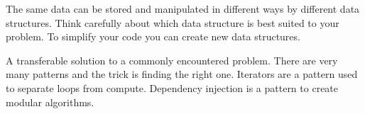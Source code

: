 \documentclass[8pt]{extarticle}
\begin{document}
\begin{bluebox}[title=Data Structures]
  The same data can be stored and manipulated in different ways by different
  data structures. Think carefully about which data structure is best suited to
  your problem. To simplify your code you can create new data structures.
\end{bluebox}

\begin{navybox}[title=Structuring Code]
\end{navybox}

\begin{bluebox}[title=Design Patterns]
  A transferable solution to a commonly encountered problem. There are very many
  patterns and the trick is finding the right one. Iterators are a pattern used
  to separate loops from compute. Dependency injection is a pattern to create
  modular algorithms.
\end{bluebox}

\furtherhelp
\end{document}

